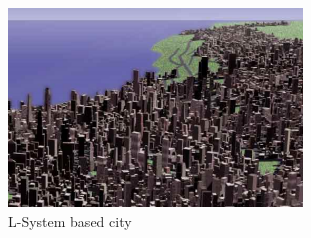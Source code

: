 \documentclass{acmtog}
\begin{document}
\begin{figure}[!htp]
  \begin{center}
    \includegraphics[width=0.6\columnwidth]{images/13_finalcity}
    \caption{L-System based city \label{fig:finalcity}}
    \end{center}
\end{figure}





\nocite{*}



\end{document}
